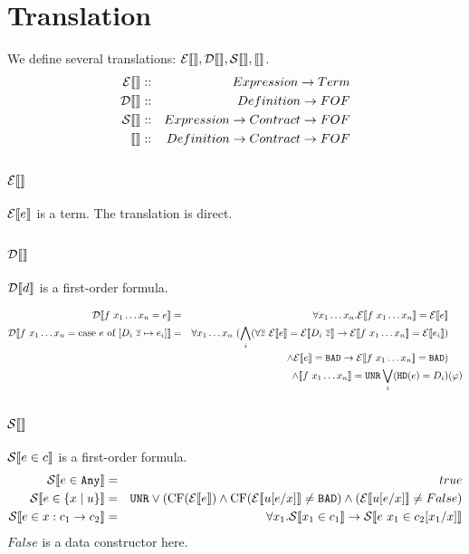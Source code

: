 \documentclass{article}
\begin{document}
\section{Translation}
We define several translations: $\mathcal{E} \llbracket  \rrbracket,\mathcal{D} \llbracket  \rrbracket,\mathcal{S} \llbracket  \rrbracket,\llbracket  \rrbracket$.
\begin{eqnarray*}
  \mathcal{E} \llbracket  \rrbracket &::& Expression \to Term \\
  \mathcal{D} \llbracket  \rrbracket &::& Definition \to FOF  \\
  \mathcal{S} \llbracket  \rrbracket &::& Expression \to Contract \to FOF \\
  \llbracket  \rrbracket &::& Definition \to Contract \to FOF \\
\end{eqnarray*}

\subsection{$\mathcal{E} \llbracket  \rrbracket$}
$\mathcal{E} \llbracket e \rrbracket$ is a term. The translation is direct.

\subsection{$\mathcal{D} \llbracket  \rrbracket$}
$\mathcal{D} \llbracket d \rrbracket$ is a first-order formula.

\begin{eqnarray*}
\mathcal{D} \llbracket f~x_1 \dots x_n = e \rrbracket &=& \forall x_1 \dots x_n.\mathcal{E} \llbracket f~x_1 \dots x_n \rrbracket = \mathcal{E} \llbracket e \rrbracket & \\
\mathcal{D} \llbracket f~x_1 \dots x_n = \mbox{case } e \mbox{ of } [D_i~\overline{z} \mapsto e_i] \rrbracket &=& \forall x_1 \dots x_n~(\bigwedge_i (\forall \overline{z}~\mathcal{E} \llbracket e \rrbracket = \mathcal{E} \llbracket D_i~\overline{z} \rrbracket \to \mathcal{E} \llbracket f~x_1 \dots x_n \rrbracket = \mathcal{E} \llbracket e_i \rrbracket) & \\
&& \land \mathcal{E} \llbracket e \rrbracket = \texttt{BAD} \to \mathcal{E} \llbracket f~x_1 \dots x_n \rrbracket = \texttt{BAD})& \\ 
&& \land \llbracket f~x_1 \dots x_n \rrbracket = \texttt{UNR} \bigvee_i (\texttt{HD}(e) = D_i) & (\varphi) \\
\end{eqnarray*}

\subsection{$\mathcal{S} \llbracket  \rrbracket$}
$\mathcal{S} \llbracket e \in c \rrbracket$ is a first-order formula.
\begin{eqnarray*}
\strans{e \in \any} &=& true \\
\strans{e \in \{x \mid u \}} &=& \unr \lor (\mbox{CF}(\etrans{e}) \land \mbox{CF}(\etrans{u[e/x]} \neq \bad) \land (\etrans{u[e/x]} \neq False) \\
\strans{e \in x:c_1 \to c_2}  &=& \forall x_1. \strans{x_1 \in c_1} \to \strans{e~x_1 \in c_2[x_1/x]} \\

\end{eqnarray*}
$False$ is a data constructor here.
\end{document}
